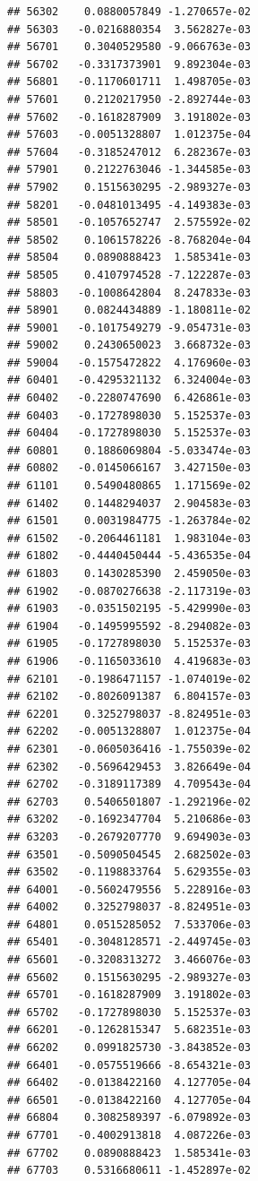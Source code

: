\documentclass[ignorenonframetext,]{beamer}
\begin{document}
\begin{frame}[fragile]
\begin{verbatim}
## 56302    0.0880057849 -1.270657e-02
## 56303   -0.0216880354  3.562827e-03
## 56701    0.3040529580 -9.066763e-03
## 56702   -0.3317373901  9.892304e-03
## 56801   -0.1170601711  1.498705e-03
## 57601    0.2120217950 -2.892744e-03
## 57602   -0.1618287909  3.191802e-03
## 57603   -0.0051328807  1.012375e-04
## 57604   -0.3185247012  6.282367e-03
## 57901    0.2122763046 -1.344585e-03
## 57902    0.1515630295 -2.989327e-03
## 58201   -0.0481013495 -4.149383e-03
## 58501   -0.1057652747  2.575592e-02
## 58502    0.1061578226 -8.768204e-04
## 58504    0.0890888423  1.585341e-03
## 58505    0.4107974528 -7.122287e-03
## 58803   -0.1008642804  8.247833e-03
## 58901    0.0824434889 -1.180811e-02
## 59001   -0.1017549279 -9.054731e-03
## 59002    0.2430650023  3.668732e-03
## 59004   -0.1575472822  4.176960e-03
## 60401   -0.4295321132  6.324004e-03
## 60402   -0.2280747690  6.426861e-03
## 60403   -0.1727898030  5.152537e-03
## 60404   -0.1727898030  5.152537e-03
## 60801    0.1886069804 -5.033474e-03
## 60802   -0.0145066167  3.427150e-03
## 61101    0.5490480865  1.171569e-02
## 61402    0.1448294037  2.904583e-03
## 61501    0.0031984775 -1.263784e-02
## 61502   -0.2064461181  1.983104e-03
## 61802   -0.4440450444 -5.436535e-04
## 61803    0.1430285390  2.459050e-03
## 61902   -0.0870276638 -2.117319e-03
## 61903   -0.0351502195 -5.429990e-03
## 61904   -0.1495995592 -8.294082e-03
## 61905   -0.1727898030  5.152537e-03
## 61906   -0.1165033610  4.419683e-03
## 62101   -0.1986471157 -1.074019e-02
## 62102   -0.8026091387  6.804157e-03
## 62201    0.3252798037 -8.824951e-03
## 62202   -0.0051328807  1.012375e-04
## 62301   -0.0605036416 -1.755039e-02
## 62302   -0.5696429453  3.826649e-04
## 62702   -0.3189117389  4.709543e-04
## 62703    0.5406501807 -1.292196e-02
## 63202   -0.1692347704  5.210686e-03
## 63203   -0.2679207770  9.694903e-03
## 63501   -0.5090504545  2.682502e-03
## 63502   -0.1198833764  5.629355e-03
## 64001   -0.5602479556  5.228916e-03
## 64002    0.3252798037 -8.824951e-03
## 64801    0.0515285052  7.533706e-03
## 65401   -0.3048128571 -2.449745e-03
## 65601   -0.3208313272  3.466076e-03
## 65602    0.1515630295 -2.989327e-03
## 65701   -0.1618287909  3.191802e-03
## 65702   -0.1727898030  5.152537e-03
## 66201   -0.1262815347  5.682351e-03
## 66202    0.0991825730 -3.843852e-03
## 66401   -0.0575519666 -8.654321e-03
## 66402   -0.0138422160  4.127705e-04
## 66501   -0.0138422160  4.127705e-04
## 66804    0.3082589397 -6.079892e-03
## 67701   -0.4002913818  4.087226e-03
## 67702    0.0890888423  1.585341e-03
## 67703    0.5316680611 -1.452897e-02

\end{verbatim}
\end{frame}
\end{document}
